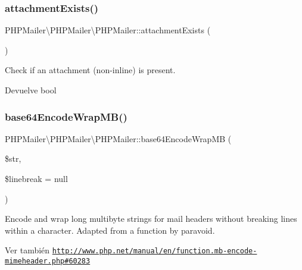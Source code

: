 \subsubsection{\texorpdfstring{attachment\+Exists()}{attachmentExists()}}
{\footnotesize\ttfamily P\+H\+P\+Mailer\textbackslash{}\+P\+H\+P\+Mailer\textbackslash{}\+P\+H\+P\+Mailer\+::attachment\+Exists (\begin{DoxyParamCaption}{ }\end{DoxyParamCaption})}

Check if an attachment (non-\/inline) is present.

\begin{DoxyReturn}{Devuelve}
bool 
\end{DoxyReturn}
\mbox{\label{classPHPMailer_1_1PHPMailer_1_1PHPMailer_a4a424b86108eaafe1d8369db737cc47f}} 
\subsubsection{\texorpdfstring{base64\+Encode\+Wrap\+M\+B()}{base64EncodeWrapMB()}}
{\footnotesize\ttfamily P\+H\+P\+Mailer\textbackslash{}\+P\+H\+P\+Mailer\textbackslash{}\+P\+H\+P\+Mailer\+::base64\+Encode\+Wrap\+MB (\begin{DoxyParamCaption}\item[{}]{\$str,  }\item[{}]{\$linebreak = {\ttfamily null} }\end{DoxyParamCaption})}

Encode and wrap long multibyte strings for mail headers without breaking lines within a character. Adapted from a function by paravoid.

\begin{DoxySeeAlso}{Ver también}
\href{http://www.php.net/manual/en/function.mb-encode-mimeheader.php#60283}{\tt http\+://www.\+php.\+net/manual/en/function.\+mb-\/encode-\/mimeheader.\+php\#60283}
\end{DoxySeeAlso}

